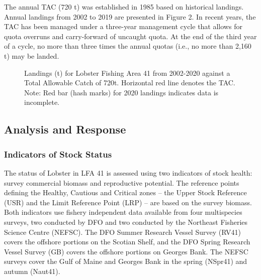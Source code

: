 \documentclass[11pt]{book}
\begin{document}
The annual TAC (720 t) was established in 1985 based on historical landings. Annual landings from 2002 to 2019 are presented in Figure 2. In recent years, the TAC has been managed under a three-year management cycle that allows for quota overruns and carry-forward of uncaught quota. At the end of the third year of a cycle, no more than three times the annual quotas (i.e., no more than 2,160 t) may be landed.
\begin{figure}[htb]

{\centering {} 

}

\caption{Landings (t) for Lobster Fishing Area 41 from 2002-2020 against a Total Allowable Catch of 720t. Horizontal red line denotes the TAC. Note: Red bar (hash marks) for 2020 landings indicates data is incomplete.}\label{fig:landings}
\end{figure}
\hypertarget{analysis-and-response}{%
\subsection{Analysis and Response}\label{analysis-and-response}}

\hypertarget{indicators-of-stock-status}{%
\subsubsection{Indicators of Stock Status}\label{indicators-of-stock-status}}

The status of Lobster in LFA 41 is assessed using two indicators of stock health: survey commercial biomass and reproductive potential. The reference points defining the Healthy, Cautious and Critical zones -- the Upper Stock Reference (USR) and the Limit Reference Point (LRP) -- are based on the survey biomass. Both indicators use fishery independent data available from four multispecies surveys, two conducted by DFO and two conducted by the Northeast Fisheries Science Centre (NEFSC). The DFO Summer Research Vessel Survey (RV41) covers the offshore portions on the Scotian Shelf, and the DFO Spring Research Vessel Survey (GB) covers the offshore portions on Georges Bank. The NEFSC surveys cover the Gulf of Maine and Georges Bank in the spring (NSpr41) and autumn (Naut41).
\end{document}
